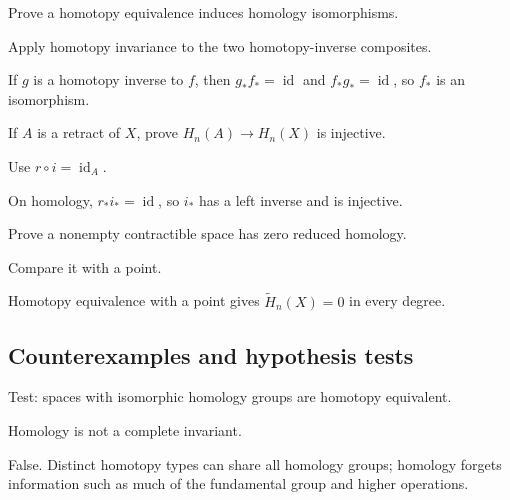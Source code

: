 \begin{exercise}\label{exr:viii20-ped-07}
Prove a homotopy equivalence induces homology isomorphisms.
\end{exercise}
\begin{hint}
Apply homotopy invariance to the two homotopy-inverse composites.
\end{hint}
\begin{solution}
If $g$ is a homotopy inverse to $f$, then $g_*f_*=\operatorname{id}$ and $f_*g_*=\operatorname{id}$, so $f_*$ is an isomorphism.
\end{solution}

\begin{exercise}\label{exr:viii20-ped-08}
If $A$ is a retract of $X$, prove $H_n(A)\to H_n(X)$ is injective.
\end{exercise}
\begin{hint}
Use $r\circ i=\operatorname{id}_A$.
\end{hint}
\begin{solution}
On homology, $r_*i_*=\operatorname{id}$, so $i_*$ has a left inverse and is injective.
\end{solution}

\begin{exercise}\label{exr:viii20-ped-09}
Prove a nonempty contractible space has zero reduced homology.
\end{exercise}
\begin{hint}
Compare it with a point.
\end{hint}
\begin{solution}
Homotopy equivalence with a point gives $\widetilde H_n(X)=0$ in every degree.
\end{solution}

\subsection*{Counterexamples and hypothesis tests}

\begin{exercise}\label{exr:viii20-ped-10}
Test: spaces with isomorphic homology groups are homotopy equivalent.
\end{exercise}
\begin{hint}
Homology is not a complete invariant.
\end{hint}
\begin{solution}
False. Distinct homotopy types can share all homology groups; homology forgets information such as much of the fundamental group and higher operations.
\end{solution}

